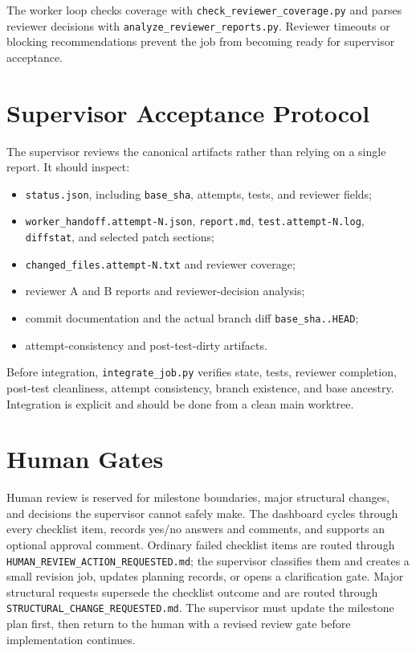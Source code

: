 \documentclass[11pt]{article}
\renewcommand{\path}[1]{\texttt{#1}}
\begin{document}
The worker loop checks coverage with \path{check\_reviewer\_coverage.py} and
parses reviewer decisions with \path{analyze\_reviewer\_reports.py}.  Reviewer
timeouts or blocking recommendations prevent the job from becoming ready for
supervisor acceptance.

\section{Supervisor Acceptance Protocol}

The supervisor reviews the canonical artifacts rather than relying on a single
report.  It should inspect:

\begin{itemize}
  \item \path{status.json}, including \path{base\_sha}, attempts, tests, and reviewer fields;
  \item \path{worker\_handoff.attempt-N.json}, \path{report.md}, \path{test.attempt-N.log}, \path{diffstat}, and selected patch sections;
  \item \path{changed\_files.attempt-N.txt} and reviewer coverage;
  \item reviewer A and B reports and reviewer-decision analysis;
  \item commit documentation and the actual branch diff \path{base\_sha..HEAD};
  \item attempt-consistency and post-test-dirty artifacts.
\end{itemize}

Before integration, \path{integrate\_job.py} verifies state, tests, reviewer
completion, post-test cleanliness, attempt consistency, branch existence, and
base ancestry.  Integration is explicit and should be done from a clean main
worktree.

\section{Human Gates}

Human review is reserved for milestone boundaries, major structural changes, and
decisions the supervisor cannot safely make.  The dashboard cycles through every
checklist item, records yes/no answers and comments, and supports an optional
approval comment.  Ordinary failed checklist items are routed through
\path{HUMAN\_REVIEW\_ACTION\_REQUESTED.md}; the supervisor classifies them and
creates a small revision job, updates planning records, or opens a clarification
gate.  Major structural requests supersede the checklist outcome and are routed
through \path{STRUCTURAL\_CHANGE\_REQUESTED.md}.  The supervisor must update the
milestone plan first, then return to the human with a revised review gate before
implementation continues.
\end{document}

